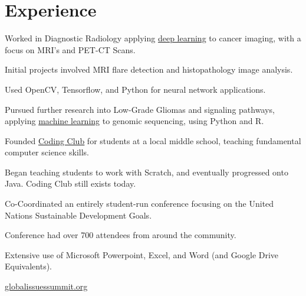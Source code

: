 \documentclass[]{deedy-resume-openfont}
\begin{document}
\begin{minipage}[t]{0.66\textwidth}

\vspace{2 mm}
\section{Experience}
\vspace{2 mm}

\begin{tightemize}
\item Worked in Diagnostic Radiology applying \underline{deep learning} to cancer imaging, with a focus on MRI's and PET-CT Scans.
\vspace{1 mm}
\item Initial projects involved MRI flare detection and histopathology image analysis.
\vspace{1 mm}
\item Used OpenCV, Tensorflow, and Python for neural network applications.
\vspace{1 mm}
\item Pursued further research into Low-Grade Gliomas and signaling pathways, applying \underline{machine learning} to genomic sequencing, using Python and R.
\end{tightemize}
\sectionsep
\vspace{2 mm}
\begin{tightemize}
\item Founded \underline{\href{https://goo.gl/KF7umR}{Coding Club}} for students at a local middle school, teaching fundamental computer science skills.
\vspace{1 mm}
\item Began teaching students to work with Scratch, and eventually progressed onto Java. Coding Club still exists today.
\end{tightemize}
\sectionsep
\vspace{2 mm}
\begin{tightemize}
\item Co-Coordinated an entirely student-run conference focusing on the United Nations Sustainable Development Goals.
\vspace{1 mm}
\item Conference had over 700 attendees from around the community.
\vspace{1 mm}
\item Extensive use of Microsoft Powerpoint, Excel, and Word (and Google Drive Equivalents).
\vspace{1 mm}
\item \url{globalissuessummit.org}
\end{tightemize}
\sectionsep


\end{minipage}
\end{document}
